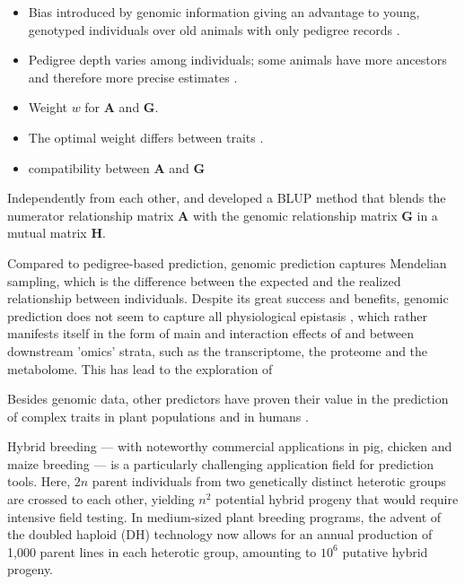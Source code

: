 \documentclass[12pt,titlepage]{article}
\begin{document}
\begin{itemize}
  \item Bias introduced by genomic information giving an advantage to young,
    genotyped individuals over old animals with only pedigree records
    \cite{Aguilar2009}.
  \item Pedigree depth varies among individuals; some animals have more
    ancestors and therefore more precise estimates \cite{Aguilar2009}.
\end{itemize}

\begin{itemize}
  \item Weight $w$ for $\mathbf{A}$ and $\mathbf{G}$.
  \item The optimal weight differs between traits \cite{Ashraf2016}.
  \item compatibility between $\mathbf{A}$ and $\mathbf{G}$
    \cite{Christensen2012}
\end{itemize}

Independently from each other,  and
 developed a BLUP method that blends the numerator
relationship matrix $\mathbf{A}$ with the genomic relationship matrix
$\mathbf{G}$ in a mutual matrix $\mathbf{H}$.

Compared to pedigree-based prediction, genomic prediction captures Mendelian
sampling, which is the difference between the expected and the realized
relationship between individuals.
Despite its great success and benefits, genomic prediction does not seem to
capture all physiological epistasis \cite{Sackton2016,Reif2015}, which rather 
manifests itself in the form of main and interaction effects of and between 
downstream 'omics' strata, such as the transcriptome, the proteome and the 
metabolome.
This has lead to the exploration of 

Besides genomic data, other predictors have proven their value in the
prediction of complex traits in plant populations \cite{Guo2016,Westhues2017}
and in humans \cite{Vazquez2016}.

Hybrid breeding --- with noteworthy commercial applications in pig, chicken and 
maize breeding --- is a particularly challenging application field for
prediction tools.
Here, $2n$ parent individuals from two genetically distinct heterotic groups are
crossed to each other, yielding $n^{2}$ potential hybrid progeny that would
require intensive field testing.
In medium-sized plant breeding programs, the advent of the doubled haploid (DH) 
technology \cite{Wedzony2009} now allows for an annual production of 1,000 
parent lines in each heterotic group, amounting to $10^{6}$ putative hybrid
progeny.
\end{document}
